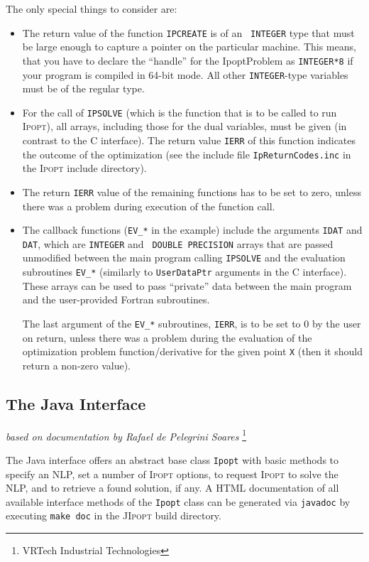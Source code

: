 \documentclass[10pt]{article}
\newcommand{\Ipopt}{\textsc{Ipopt}\xspace}
\newcommand{\JIpopt}{\textsc{JIpopt}\xspace}
\begin{document}
The only special things to consider are:
\begin{itemize}
\item The return value of the function {\tt IPCREATE} is of an {\tt
    INTEGER} type that must be large enough to capture a pointer
  on the particular machine.  This means, that you have to declare
  the ``handle'' for the IpoptProblem as {\tt INTEGER*8} if your
  program is compiled in 64-bit mode.  All other {\tt INTEGER}-type
  variables must be of the regular type.
\item For the call of {\tt IPSOLVE} (which is the function that is to
  be called to run \Ipopt), all arrays, including those for the dual
  variables, must be given (in contrast to the C interface).  The
  return value {\tt IERR} of this function indicates the outcome of
  the optimization (see the include file {\tt IpReturnCodes.inc} in
  the \Ipopt include directory).
\item The return {\tt IERR} value of the remaining functions has to be
  set to zero, unless there was a problem during execution of the
  function call.
\item The callback functions ({\tt EV\_*} in the example) include the
  arguments {\tt IDAT} and {\tt DAT}, which are {\tt INTEGER} and {\tt
    DOUBLE PRECISION} arrays that are passed unmodified between the
  main program calling {\tt IPSOLVE} and the evaluation subroutines
  {\tt EV\_*} (similarly to {\tt UserDataPtr} arguments in the C
  interface).  These arrays can be used to pass ``private'' data
  between the main program and the user-provided Fortran subroutines.

  The last argument of the {\tt EV\_*} subroutines, {\tt IERR}, is to
  be set to 0 by the user on return, unless there was a problem
  during the evaluation of the optimization problem
  function/derivative for the given point {\tt X} (then it should
  return a non-zero value).
\end{itemize}

\subsection{The Java Interface}
\hfill \textit{based on documentation by Rafael de Pelegrini Soares}%
\footnote{VRTech Industrial Technologies}
\medskip

The Java interface offers an abstract base class {\tt Ipopt} with basic 
methods to specify an NLP, set a number of \Ipopt options, to request \Ipopt 
to solve the NLP, and to retrieve a found solution, if any.
A HTML documentation of all available interface methods of the {\tt Ipopt} 
class can be generated via {\tt javadoc} by executing {\tt make doc} in the 
\JIpopt build directory.
\end{document}

